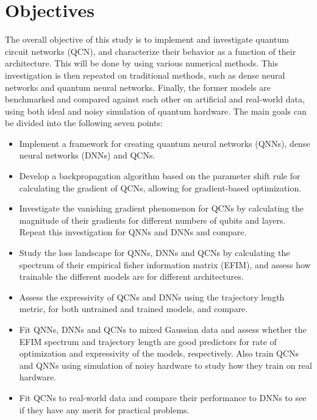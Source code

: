 \section{Objectives}
The overall objective of this study is to implement and investigate quantum circuit networks (QCN), and characterize their behavior as a function of their architecture. This will be done by using various numerical methods. This investigation is then repeated on traditional methods, such as dense neural networks and quantum neural networks. Finally, the former models are benchmarked and compared against each other on artificial and real-world data, using both ideal and noisy simulation of quantum hardware. The main goals can be divided into the following seven points:

\begin{itemize}
    \item Implement a framework for creating quantum neural networks (QNNs), dense neural networks (DNNs) and QCNs.
    
    \item Develop a backpropagation algorithm based on the parameter shift rule for calculating the gradient of QCNs, allowing for gradient-based optimization. 
    
    \item Investigate the vanishing gradient phenomenon for QCNs by calculating the magnitude of their gradients for different numbers of qubits and layers. Repeat this investigation for QNNs and DNNs and compare.
    
    \item Study the loss landscape for QNNs, DNNs and QCNs by calculating the spectrum of their empirical fisher information matrix (EFIM), and assess how trainable the different models are for different architectures.
    
    \item Assess the expressivity of QCNs and DNNs using the trajectory length metric, for both untrained and trained models, and compare. 
    
    \item Fit QNNs, DNNs and QCNs to mixed Gaussian data and assess whether the EFIM spectrum and trajectory length are good predictors for rate of optimization and expressivity of the models, respectively. Also train QCNs and QNNs using simulation of noisy hardware to study how they train on real hardware.
    
    \item Fit QCNs to real-world data and compare their performance to DNNs to see if they have any merit for practical problems. 
\end{itemize}